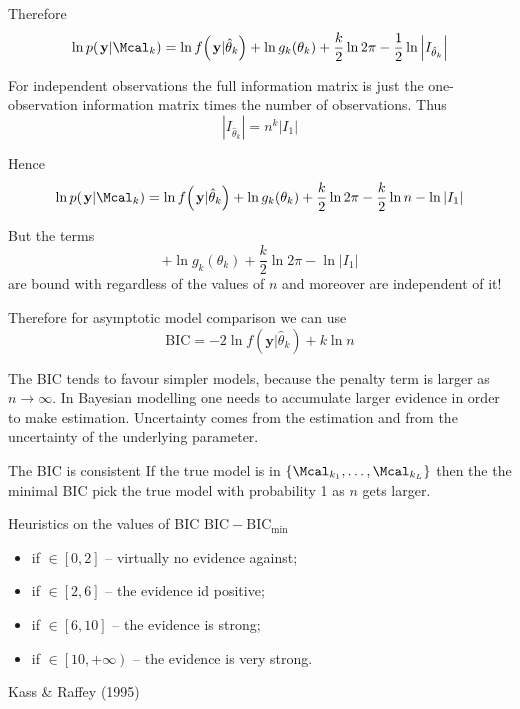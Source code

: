 \documentclass[a4paper]{article}
\newcommand{\obj}[1]{{\left\{ #1 \right \}}}
\newcommand{\clo}[1]{{\left [ #1 \right ]}}
\newcommand{\clop}[1]{{\left [ #1 \right )}}
\newcommand{\brac}[1]{{\left ( #1 \right )}}
\newcommand{\induc}[1]{{\left . #1 \right \vert}}
\newcommand{\abs}[1]{{\left | #1 \right |}}
\begin{document}
Therefore
\[\ln p\brac{\induc{\mathbf{y}}\Mcal_k} = \ln f\brac{\induc{\mathbf{y}}\hat{\theta}_k} + \ln g_k(\theta_k) + \frac{k}{2} \ln 2 \pi - \frac{1}{2}\ln \abs{I_{\hat{\theta}_k}} \]

For independent observations the full information matrix is just the one-observation information matrix times the number of observations.
Thus 
\[\abs{I_{\hat{\theta}_k}} = n^k \abs{I_1}\]

Hence 
\[\ln p\brac{\induc{\mathbf{y}}\Mcal_k} = \ln f\brac{\induc{\mathbf{y}}\hat{\theta}_k} + \ln g_k(\theta_k) + \frac{k}{2} \ln 2 \pi - \frac{k}{2}\ln n - \ln \abs{I_1} \]

But the terms 
\[ + \ln g_k(\theta_k) + \frac{k}{2} \ln 2 \pi - \ln \abs{I_1}\]
are bound with regardless of the values of $n$ and moreover are independent of it!

Therefore for asymptotic model comparison we can use
\[\text{BIC} = -2\ln f\brac{\induc{\mathbf{y}}\hat{\theta}_k} + k\ln n \]

The BIC tends to favour simpler models, because the penalty term is larger as $n\to \infty$.
In Bayesian modelling one needs to accumulate larger evidence in order to make estimation.
Uncertainty comes from the estimation and from the uncertainty of the underlying parameter.


The BIC is consistent
If the true model is in $\obj{\Mcal_{k_1},\ldots,\Mcal_{k_L}}$ then the the minimal BIC pick the true model with probability 1 as $n$ gets larger.

Heuristics on the values of BIC $\text{BIC}-\text{BIC}_{\min}$
\begin{itemize}
	\item if $\in\clo{0,2}$ -- virtually no evidence against;
	\item if $\in\clo{2,6}$ -- the evidence id positive;
	\item if $\in\clo{6,10}$ -- the evidence is strong;
	\item if $\in\clop{10, +\infty}$ -- the evidence is very strong.
\end{itemize}

Kass & Raffey (1995)




\end{document}
